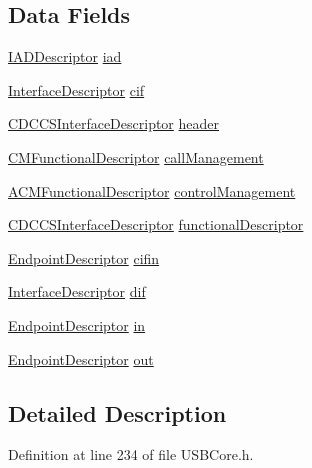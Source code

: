 \subsection*{Data Fields}
\begin{DoxyCompactItemize}
\item 
\hyperlink{struct_i_a_d_descriptor}{I\+A\+D\+Descriptor} \hyperlink{struct_c_d_c_descriptor_a934c0c9afb655c1127dc081488de0952}{iad}
\item 
\hyperlink{struct_interface_descriptor}{Interface\+Descriptor} \hyperlink{struct_c_d_c_descriptor_a59ca319c155277d02e33d59292dc6d42}{cif}
\item 
\hyperlink{struct_c_d_c_c_s_interface_descriptor}{C\+D\+C\+C\+S\+Interface\+Descriptor} \hyperlink{struct_c_d_c_descriptor_a8cb2af4efd1b36ad3d11f1176a5628b3}{header}
\item 
\hyperlink{struct_c_m_functional_descriptor}{C\+M\+Functional\+Descriptor} \hyperlink{struct_c_d_c_descriptor_a72f10e0be1c5b49a3bbd81111053bf3e}{call\+Management}
\item 
\hyperlink{struct_a_c_m_functional_descriptor}{A\+C\+M\+Functional\+Descriptor} \hyperlink{struct_c_d_c_descriptor_af1f3192e4a02d190879896f1a664e8b3}{control\+Management}
\item 
\hyperlink{struct_c_d_c_c_s_interface_descriptor}{C\+D\+C\+C\+S\+Interface\+Descriptor} \hyperlink{struct_c_d_c_descriptor_a94d8e9fea32078b996a9e272e1904c07}{functional\+Descriptor}
\item 
\hyperlink{struct_endpoint_descriptor}{Endpoint\+Descriptor} \hyperlink{struct_c_d_c_descriptor_aceee3836101f5463719c5d4bfb8cecd7}{cifin}
\item 
\hyperlink{struct_interface_descriptor}{Interface\+Descriptor} \hyperlink{struct_c_d_c_descriptor_a631454a199b3c6c9ff9764fbe1b19568}{dif}
\item 
\hyperlink{struct_endpoint_descriptor}{Endpoint\+Descriptor} \hyperlink{struct_c_d_c_descriptor_a93dcef3b3e3062b904269bcad94771b5}{in}
\item 
\hyperlink{struct_endpoint_descriptor}{Endpoint\+Descriptor} \hyperlink{struct_c_d_c_descriptor_afcf3c947c6e5ace7853bc3e313c0c4aa}{out}
\end{DoxyCompactItemize}


\subsection{Detailed Description}


Definition at line 234 of file U\+S\+B\+Core.\+h.



